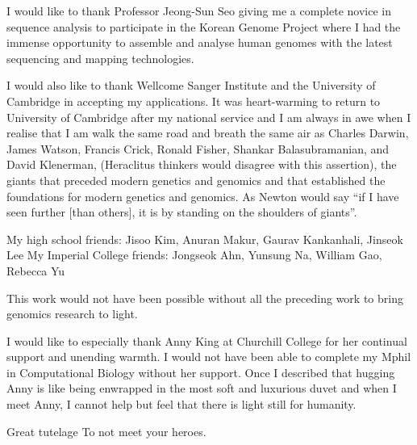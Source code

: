 
\begin{acknowledgements}      


I would like to thank Professor Jeong-Sun Seo giving me a complete novice in sequence analysis to participate in the Korean Genome Project where I had the immense opportunity to assemble and analyse human genomes with the latest sequencing and mapping technologies.

I would also like to thank Wellcome Sanger Institute and the University of Cambridge in accepting my applications. It was heart-warming to return to University of Cambridge after my national service and I am always in awe when I realise that I am walk the same road and breath the same air as Charles Darwin, James Watson, Francis Crick, Ronald Fisher, Shankar Balasubramanian, and David Klenerman,
 (Heraclitus thinkers would disagree with this assertion), the giants that preceded modern genetics and genomics and that established the foundations for modern genetics and genomics. As Newton would say “if I have seen further [than others], it is by standing on the shoulders of giants”.

My high school friends: Jisoo Kim, Anuran Makur, Gaurav Kankanhali, Jinseok Lee
My Imperial College friends: Jongseok Ahn, Yunsung Na, William Gao, Rebecca Yu


This work would not have been possible without all the preceding work to bring genomics research to light.  

I would like to especially thank Anny King at Churchill College for her continual support and unending warmth. I would not have been able to complete my Mphil in Computational Biology without her support. Once I described that hugging Anny is like being enwrapped in the most soft and luxurious duvet and when I meet Anny, I cannot help but feel that there is light still for humanity. 

Great tutelage 
To not meet your heroes.


\end{acknowledgements}
